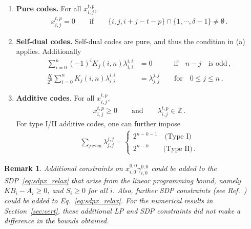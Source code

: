 \documentclass[12pt,a4paper]{amsart}
\newtheorem{remark}[theorem]{Remark}
\newcommand{\nn}{\nonumber}
\begin{document}
\begin{enumerate} [label=(\alph*)]\setlength{\itemsep}{3pt}
\item {\bf Pure codes.} 
For all $x^{t,p}_{i,j}$,
% 
\begin{align}\label{eq:klred_pure_xijtp}
x^{t,p}_{i,j}=0 \quad\quad \text{if} \quad\quad \{i,j,i+j-t-p\} \cap \{1,\cdots, \delta-1\} \neq \emptyset\,.
\end{align}
% 
\item {\bf Self-dual codes.} Self-dual codes are pure, and thus the condition in (a) applies. Additionally
\begin{align}\label{eq:seldualred}
 \sum^n_{i=0} (-1)^i K_j(i,n) \lambda^{i,i}_{i,i} &=0 \quad\quad \quad  \text{if} \quad  n-j \quad \text{is odd}\,, \nn\\
\frac{K}{2^n}\sum^n_{i=0} K_j(i,n) \lambda^{i,i}_{i,i}
 &= 
	\lambda^{j,j}_{j,j}  \quad \quad \text{for} \quad 0\leq j \leq n \,,
\end{align}
\item {\bf Additive codes}. For all $x^{t,p}_{i,j}$,
% 
\begin{align}\label{eq:add_sym_red}
x^{t,p}_{i,j} \geq 0 \quad\quad \text{and}  \quad\quad \lambda^{t,p}_{i,j}\in \mathbb{Z}\,.
\end{align}
For type I/II additive codes, one can further impose
\begin{align}\label{eq:add_type_symred}
	\sum_{j\,\text{even}} \lambda^{j,j}_{j,j} =
	\begin{cases}
2^{n-k-1} \quad \text{(Type I)} \\  2^{n-k} \quad \quad \!\text{(Type II)}\,.
	\end{cases}
\end{align}

\end{enumerate}


\begin{remark}\label{rmk:extraconst}
Additional constraints on 
$x^{0,0}_{i,0}\gamma^{0,0}_{i,0}$
could be added to the SDP~\eqref{eq:sdpx_relax} that arise from the linear programming bound, namely
$KB_i-A_i\geq 0$, 
and 
$S_i\geq 0$ for all $i$. 
Also, further SDP constraints 
(see Ref.~\cite[Theorem 22]{munne2025sdpboundsquantumcodes})
could be added to Eq.~\eqref{eq:sdpx_relax}.
% 
For the numerical results in Section~\ref{sec:cert}, 
these additional LP and SDP constraints did not make a difference in the bounds obtained.
\end{remark}
%
\end{document}
